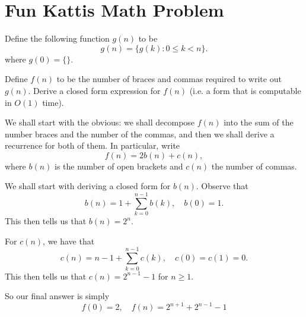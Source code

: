 \documentclass[a4paper, 12pt]{article}
\begin{document}
\section*{Fun Kattis Math Problem}

\begin{chirpbox}
\begin{problem}
    Define the following function \( g(n) \) to be
    \[
        g(n) = \{ g(k) \colon 0 \le k < n \}
    .\]
    where \( g(0) = \{\} \).

    \vspace{0.3cm}

    Define \( f(n) \) to be the number of braces and commas required to write out \( g(n) \). Derive a closed form expression for \( f(n) \) (i.e. a form that is computable in \( O(1) \) time).
\end{problem}
\end{chirpbox}

\begin{solution}
    We shall start with the obvious: we shall decompose \( f(n) \) into the sum of the number braces and the number of the commas, and then we shall derive a recurrence for both of them. In particular, write
    \[
        f(n) = 2 b(n) + c(n)
    ,\]
    where \( b(n) \) is the number of open brackets and \( c(n) \) the number of commas.

    We shall start with deriving a closed form for \( b(n) \). Observe that
    \[
        b(n) = 1 + \sum_{k = 0}^{n - 1} b(k), \quad b(0) = 1
    .\]
    This then tells us that \( b(n) = 2^n \).

    For \( c(n) \), we have that
    \[
        c(n) = n - 1 + \sum_{k = 0}^{n - 1} c(k), \quad c(0) = c(1) = 0
    .\]
    This then tells us that \( c(n) = 2^{n - 1} - 1 \) for \( n \ge 1 \).

    So our final answer is simply
    \[
        f(0) = 2, \quad f(n) = 2^{n + 1} + 2^{n-1} - 1
    \]
\end{solution}
\end{document}
